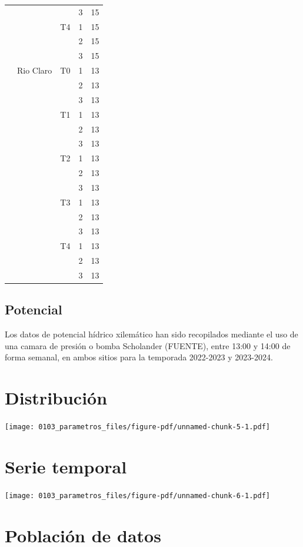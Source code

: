 \documentclass[
  letterpaper,
  DIV=11,
  numbers=noendperiod]{scrreprt}
\begin{document}
\begin{longtable}[]{@{}llllr@{}}
& & & 3 & 15 \\
& & T4 & 1 & 15 \\
& & & 2 & 15 \\
& & & 3 & 15 \\
& Rio Claro & T0 & 1 & 13 \\
& & & 2 & 13 \\
& & & 3 & 13 \\
& & T1 & 1 & 13 \\
& & & 2 & 13 \\
& & & 3 & 13 \\
& & T2 & 1 & 13 \\
& & & 2 & 13 \\
& & & 3 & 13 \\
& & T3 & 1 & 13 \\
& & & 2 & 13 \\
& & & 3 & 13 \\
& & T4 & 1 & 13 \\
& & & 2 & 13 \\
& & & 3 & 13 \\
\end{longtable}

\section{Potencial}\label{potencial}

Los datos de potencial hídrico xilemático han sido recopilados mediante
el uso de una camara de presión o bomba Scholander (FUENTE), entre 13:00
y 14:00 de forma semanal, en ambos sitios para la temporada 2022-2023 y
2023-2024.

\chapter{Distribución}

\begin{center}
\texttt{[image: 0103\_parametros\_files/figure-pdf/unnamed-chunk-5-1.pdf]}
\end{center}

\chapter{Serie temporal}

\begin{center}
\texttt{[image: 0103\_parametros\_files/figure-pdf/unnamed-chunk-6-1.pdf]}
\end{center}

\chapter{Población de datos}
\end{document}
